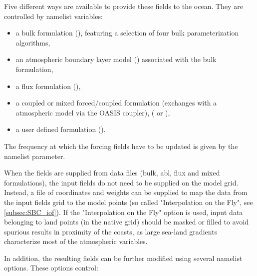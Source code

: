 \documentclass[../main/NEMO_manual]{subfiles}
\begin{document}
Five different ways are available to provide these fields to the ocean. They are controlled by
namelist  variables:

\begin{itemize}
\item a bulk formulation (), featuring a selection of four bulk parameterization algorithms,
\item an atmospheric boundary layer model () associated with the bulk formulation,
\item a flux formulation (),
\item a coupled or mixed forced/coupled formulation (exchanges with a atmospheric model via the OASIS coupler),
( or ),
\item a user defined formulation ().
\end{itemize}

The frequency at which the forcing fields have to be updated is given by the  namelist parameter.

When the fields are supplied from data files (bulk, abl, flux and mixed formulations),
the input fields do not need to be supplied on the model grid.
Instead, a file of coordinates and weights can be supplied to map the data from the input fields grid to
the model points (so called "Interpolation on the Fly", see \autoref{subsec:SBC_iof}).
If the "Interpolation on the Fly" option is used, input data belonging to land points (in the native grid)
should be masked or filled to avoid spurious results in proximity of the coasts, as
large sea-land gradients characterize most of the atmospheric variables.

In addition, the resulting fields can be further modified using several namelist options.
These options control:
\end{document}
